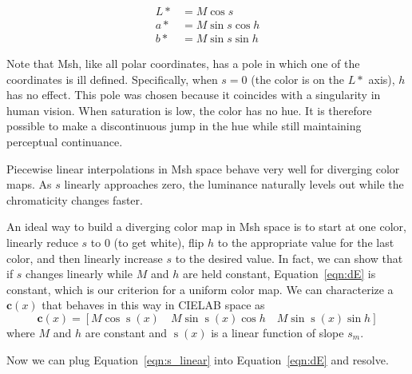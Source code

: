 \documentclass{acmsiggraph}               %
\newcommand{\Lab}{CIELAB\xspace}
\newcommand{\Msh}{Msh\xspace}
\newcommand*{\cvec}[1]{\mathbf{#1}}
\begin{document}
\begin{equation}
  \begin{split}
    L* &= M \cos s \\
    a* &= M \sin s \cos h \\
    b* &= M \sin s \sin h
  \end{split}
  \label{eqn:MshToLab}
\end{equation}

Note that \Msh, like all polar coordinates, has a pole in which one of the
coordinates is ill defined.  Specifically, when $s = 0$ (the color is on
the $L*$ axis), $h$ has no effect.  This pole was chosen because it
coincides with a singularity in human vision.  When saturation is low, the
color has no hue.  It is therefore possible to make a discontinuous jump
in the hue while still maintaining perceptual continuance.

Piecewise linear interpolations in \Msh space behave very well for
diverging color maps.  As $s$ linearly approaches zero, the luminance
naturally levels out while the chromaticity changes faster.

An ideal way to build a diverging color map in \Msh space is to start at
one color, linearly reduce $s$ to 0 (to get white), flip $h$ to the
appropriate value for the last color, and then linearly increase $s$ to the
desired value.  In fact, we can show that if $s$ changes linearly while $M$
and $h$ are held constant, Equation~\ref{eqn:dE} is constant, which is our
criterion for a uniform color map.  We can characterize a $\cvec{c}(x)$ that
behaves in this way in \Lab space as
\begin{equation}
  \cvec{c}(x) = [ M \cos \operatorname{s}(x) \quad
  M \sin \operatorname{s}(x) \cos h \quad
  M \sin \operatorname{s}(x) \sin h ]
  \label{eqn:s_linear}
\end{equation}
where $M$ and $h$ are constant and $\operatorname{s}(x)$ is a linear
function of slope $s_m$.

Now we can plug Equation~\ref{eqn:s_linear} into Equation~\ref{eqn:dE} and
resolve.
\end{document}
